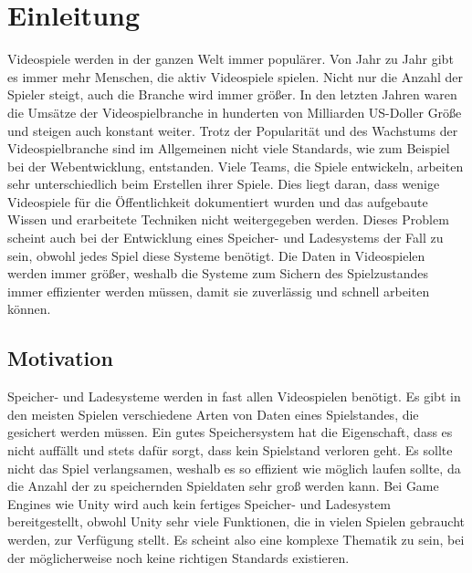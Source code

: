 \chapter{Einleitung}\label{ch:introduction}
Videospiele werden in der ganzen Welt immer populärer. Von Jahr zu Jahr gibt es immer mehr Menschen, die aktiv Videospiele spielen.\cite{explodingtopicsManyGamers} Nicht nur die Anzahl der Spieler steigt, auch die Branche wird immer größer. In den letzten Jahren waren die Umsätze der Videospielbranche in hunderten von Milliarden US-Doller Größe und steigen auch konstant weiter.\cite{statistaUmsatzVideogames} Trotz der Popularität und des Wachstums der Videospielbranche sind im Allgemeinen nicht viele Standards, wie zum Beispiel bei der Webentwicklung, entstanden. Viele Teams, die Spiele entwickeln, arbeiten sehr unterschiedlich beim Erstellen ihrer Spiele. Dies liegt daran, dass wenige Videospiele für die Öffentlichkeit dokumentiert wurden und das aufgebaute Wissen und erarbeitete Techniken nicht weitergegeben werden. Dieses Problem scheint auch bei der Entwicklung eines Speicher- und Ladesystems der Fall zu sein, obwohl jedes Spiel diese Systeme benötigt. Die Daten in Videospielen werden immer größer, weshalb die Systeme zum Sichern des Spielzustandes immer effizienter werden müssen, damit sie zuverlässig und schnell arbeiten können.

\section{Motivation}
Speicher- und Ladesysteme werden in fast allen Videospielen benötigt. Es gibt in den meisten Spielen verschiedene Arten von Daten eines Spielstandes, die gesichert werden müssen. Ein gutes Speichersystem hat die Eigenschaft, dass es nicht auffällt und stets dafür sorgt, dass kein Spielstand verloren geht. Es sollte nicht das Spiel verlangsamen, weshalb es so effizient wie möglich laufen sollte, da die Anzahl der zu speichernden Spieldaten sehr groß werden kann. Bei Game Engines wie Unity wird auch kein fertiges Speicher- und Ladesystem bereitgestellt, obwohl Unity sehr viele Funktionen, die in vielen Spielen gebraucht werden, zur Verfügung stellt. Es scheint also eine komplexe Thematik zu sein, bei der möglicherweise noch keine richtigen Standards existieren. 

